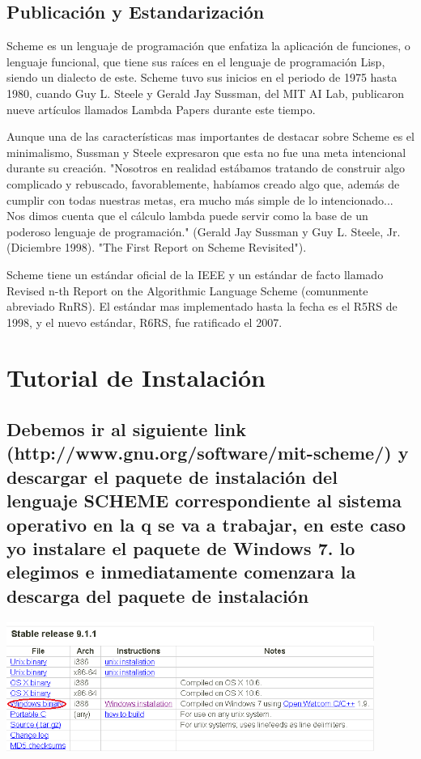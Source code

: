 \documentclass[11pt]{article} %
\begin{document}
\subsection{Publicación y Estandarización}

Scheme es un lenguaje de programación que enfatiza la aplicación de funciones, o lenguaje funcional, que tiene sus raíces en el lenguaje de programación Lisp, siendo un dialecto de este. Scheme tuvo sus inicios en el periodo de 1975 hasta 1980, cuando Guy L. Steele y Gerald Jay Sussman, del MIT AI Lab, publicaron nueve artículos llamados Lambda Papers durante este tiempo.

Aunque una de las características mas importantes de destacar sobre Scheme es el minimalismo, Sussman y Steele expresaron que esta no fue una meta intencional durante su creación. "Nosotros en realidad estábamos tratando de construir algo complicado y rebuscado, favorablemente, habíamos creado algo que, además de cumplir con todas nuestras metas, era mucho más simple de lo intencionado... Nos dimos cuenta que el cálculo lambda puede servir como la base de un poderoso lenguaje de programación." (Gerald Jay Sussman y Guy L. Steele, Jr. (Diciembre 1998). "The First Report on Scheme Revisited").

Scheme tiene un estándar oficial de la IEEE y un estándar de facto llamado Revised n-th Report on the Algorithmic Language Scheme (comunmente abreviado RnRS). El estándar mas implementado hasta la fecha es el R5RS de 1998, y el nuevo estándar, R6RS, fue ratificado el 2007.
\section{Tutorial de Instalación}
\subsection{Debemos ir al siguiente link (http://www.gnu.org/software/mit-scheme/) y descargar el paquete de instalación del lenguaje SCHEME correspondiente al sistema operativo en la q se va a trabajar, en este caso yo instalare el paquete de Windows 7.
lo elegimos e inmediatamente comenzara la descarga del paquete de instalación}
\begin{center}
\includegraphics[width=12cm]{1.png}
\end{center}
\end{document}
